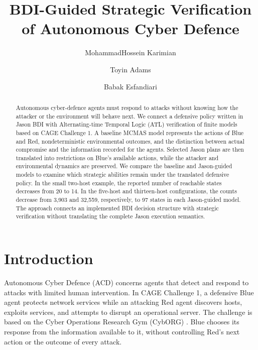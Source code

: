 \documentclass[runningheads]{llncs}
\begin{document}
\title{BDI-Guided Strategic Verification of Autonomous Cyber Defence}


\author{MohammadHossein Karimian \and Toyin Adams \and Babak Esfandiari }



\maketitle

\begin{abstract}
Autonomous cyber-defence agents must respond to attacks without knowing how the attacker or the environment will behave next. We connect a defensive policy written in Jason BDI with Alternating-time Temporal Logic (ATL) verification of finite models based on CAGE Challenge 1. A baseline MCMAS model represents the actions of Blue and Red, nondeterministic environmental outcomes, and the distinction between actual compromise and the information recorded for the agents. Selected Jason plans are then translated into restrictions on Blue's available actions, while the attacker and environmental dynamics are preserved. We compare the baseline and Jason-guided models to examine which strategic abilities remain under the translated defensive policy. In the small two-host example, the reported number of reachable states decreases from 20 to 14. In the five-host and thirteen-host configurations, the counts decrease from 3,903 and 32,559, respectively, to 97 states in each Jason-guided model. The approach connects an implemented BDI decision structure with strategic verification without translating the complete Jason execution semantics.

\end{abstract}

\section{Introduction}
\label{sec:introduction}
\noindent
Autonomous Cyber Defence (ACD) concerns agents that detect and respond to attacks with limited human intervention. In CAGE Challenge 1, a defensive Blue agent protects network services while an attacking Red agent discovers hosts, exploits services, and attempts to disrupt an operational server. The challenge is based on the Cyber Operations Research Gym (CybORG) \cite{standen2021cyborg,cage2021challenge}. Blue chooses its response from the information available to it, without controlling Red's next action or the outcome of every attack.
\end{document}
